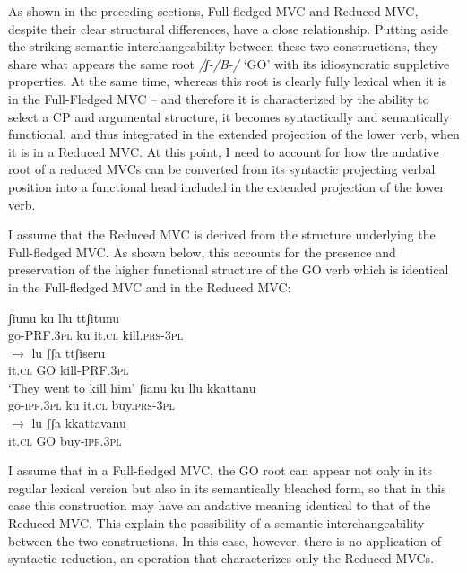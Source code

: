 \documentclass[output=paper]{langscibook}
\begin{document}
As shown in the preceding sections, Full-fledged MVC and Reduced MVC, despite their clear structural differences, have a close relationship. Putting aside the striking semantic interchangeability between these two constructions, they share what appears the same root \textit{/ʃ-/B-/} ‘GO’ with its idiosyncratic suppletive properties. At the same time, whereas this root is clearly fully lexical when it is in the  Full-Fledged MVC -- and therefore it is characterized by the ability to select a CP and argumental structure, it becomes syntactically and semantically functional, and thus integrated in the extended projection of the lower verb, when it is in a Reduced MVC.  At this point, I need to account for how the andative root of a reduced MVCs can be converted from its syntactic projecting verbal position into a functional head included in the extended projection of the lower verb.

I assume that the Reduced MVC is derived from the structure underlying the Full-fledged MVC. As shown below, this accounts for the presence and preservation of the higher functional structure of the GO verb which is identical in the Full-fledged MVC and in the Reduced MVC:

\ea \label{ac62}
    \ea \label{ac62a}
        \ea\label{ac62ai}\gll ʃiunu ku llu ttʃitunu\\
        go-PRF.\textsc{3pl} ku it.\textsc{cl} kill.\textsc{prs}-\textsc{3pl}\\
        \ex \label{ac62aii}$\rightarrow$ \gll lu    ʃʃa   ttʃiseru\\
        it.\textsc{cl}  GO  kill-PRF.\textsc{3pl}\\
        \glt ‘They went to kill him’
        \z
    \ex\label{ac62b}
        \ea \label{ac62bi}\gll ʃianu ku  llu kkattanu\\
        go-\textsc{ipf}.\textsc{3pl} ku it.\textsc{cl} buy.\textsc{prs}-\textsc{3pl}\\
        \ex \label{ac62bii}$\rightarrow$ \gll lu ʃʃa  kkattavanu\\
        it.\textsc{cl} GO  buy-\textsc{ipf}.\textsc{3pl}\\
        \z
    \z
\z

I assume that in a Full-fledged MVC, the GO root can appear not only in its regular lexical version but also in its semantically bleached form, so that in this case this construction may have an andative meaning identical to that of the Reduced MVC. This explain the possibility of a semantic interchangeability between the two constructions. In this case, however, there is no application of syntactic reduction, an operation that characterizes only the Reduced MVCs.
\end{document}
